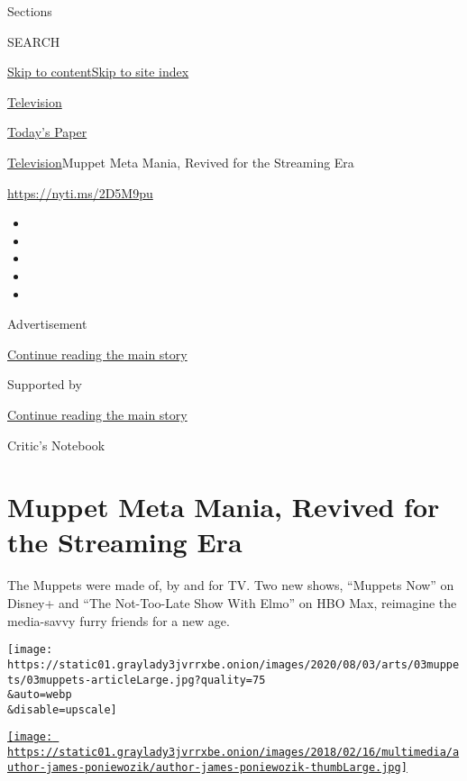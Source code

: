Sections

SEARCH

\protect\hyperlink{site-content}{Skip to
content}\protect\hyperlink{site-index}{Skip to site index}

\href{https://www.nytimes3xbfgragh.onion/section/arts/television}{Television}

\href{https://myaccount.nytimes3xbfgragh.onion/auth/login?response_type=cookie\&client_id=vi}{}

\href{https://www.nytimes3xbfgragh.onion/section/todayspaper}{Today's
Paper}

\href{/section/arts/television}{Television}\textbar{}Muppet Meta Mania,
Revived for the Streaming Era

\url{https://nyti.ms/2D5M9pu}

\begin{itemize}
\item
\item
\item
\item
\item
\end{itemize}

Advertisement

\protect\hyperlink{after-top}{Continue reading the main story}

Supported by

\protect\hyperlink{after-sponsor}{Continue reading the main story}

Critic's Notebook

\hypertarget{muppet-meta-mania-revived-for-the-streaming-era}{%
\section{Muppet Meta Mania, Revived for the Streaming
Era}\label{muppet-meta-mania-revived-for-the-streaming-era}}

The Muppets were made of, by and for TV. Two new shows, ``Muppets Now''
on Disney+ and ``The Not-Too-Late Show With Elmo'' on HBO Max, reimagine
the media-savvy furry friends for a new age.

\texttt{[image: https://static01.graylady3jvrrxbe.onion/images/2020/08/03/arts/03muppets/03muppets-articleLarge.jpg?quality=75\\\&auto=webp\\\&disable=upscale]}

\href{https://www.nytimes3xbfgragh.onion/by/james-poniewozik}{\texttt{[image: https://static01.graylady3jvrrxbe.onion/images/2018/02/16/multimedia/author-james-poniewozik/author-james-poniewozik-thumbLarge.jpg]}}

